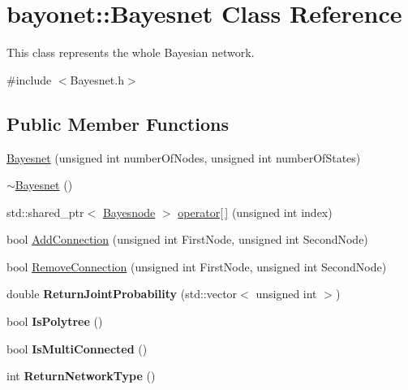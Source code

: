 \hypertarget{classbayonet_1_1_bayesnet}{\section{bayonet\-:\-:Bayesnet Class Reference}
\label{classbayonet_1_1_bayesnet}
}


This class represents the whole Bayesian network.  




{\ttfamily \#include $<$Bayesnet.\-h$>$}

\subsection*{Public Member Functions}
\begin{DoxyCompactItemize}
\item 
\hyperlink{classbayonet_1_1_bayesnet_a737f36870a5ff30826f205306a3ebaa0}{Bayesnet} (unsigned int number\-Of\-Nodes, unsigned int number\-Of\-States)
\item 
\hyperlink{classbayonet_1_1_bayesnet_af0d3ee29b0676789a3c5d1c33a0e36a2}{$\sim$\-Bayesnet} ()
\item 
std\-::shared\-\_\-ptr$<$ \hyperlink{classbayonet_1_1_bayesnode}{Bayesnode} $>$ \hyperlink{classbayonet_1_1_bayesnet_a805e5513cfef8b16f5f6f38f93aab5db}{operator\mbox{[}$\,$\mbox{]}} (unsigned int index)
\item 
bool \hyperlink{classbayonet_1_1_bayesnet_aca30de1deda07143604927588e2ff470}{Add\-Connection} (unsigned int First\-Node, unsigned int Second\-Node)
\item 
bool \hyperlink{classbayonet_1_1_bayesnet_a73566585e97c08b87160c74796d00bbd}{Remove\-Connection} (unsigned int First\-Node, unsigned int Second\-Node)
\item 
\hypertarget{classbayonet_1_1_bayesnet_a6f8bf99107923f69539eb7c3c8ad1dd2}{double {\bfseries Return\-Joint\-Probability} (std\-::vector$<$ unsigned int $>$)}\label{classbayonet_1_1_bayesnet_a6f8bf99107923f69539eb7c3c8ad1dd2}

\item 
\hypertarget{classbayonet_1_1_bayesnet_adb81cc447fe07fab5652c7a6b2fe9375}{bool {\bfseries Is\-Polytree} ()}\label{classbayonet_1_1_bayesnet_adb81cc447fe07fab5652c7a6b2fe9375}

\item 
\hypertarget{classbayonet_1_1_bayesnet_af82ed68cc718009c948d681addd48e23}{bool {\bfseries Is\-Multi\-Connected} ()}\label{classbayonet_1_1_bayesnet_af82ed68cc718009c948d681addd48e23}

\item 
\hypertarget{classbayonet_1_1_bayesnet_a6a3fa624a2e63c642112e80f6683edc5}{int {\bfseries Return\-Network\-Type} ()}\label{classbayonet_1_1_bayesnet_a6a3fa624a2e63c642112e80f6683edc5}

\end{DoxyCompactItemize}
